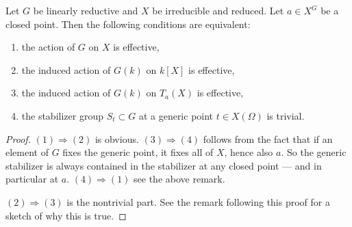 \documentclass[12pt]{article}
\begin{document}
\begin{lemma}[2.4]
Let $G$ be linearly reductive and $X$ be irreducible and reduced.  
Let $a \in X^G$ be a closed point. Then the following conditions are equivalent:
\begin{enumerate}
   \item the action of $G$ on $X$ is effective,
   \item the induced action of $G(k)$ on $k[X]$ is effective,
   \item the induced action of $G(k)$ on $T_a(X)$ is effective,
   \item the stabilizer group $S_t \subset G$ at a generic point $t \in X(\Omega)$ is trivial.
\end{enumerate}
\end{lemma}
\begin{proof}
$(1) \Rightarrow (2)$ is obvious.
$(3) \Rightarrow (4)$ follows from the fact that if an element of $G$ fixes the generic point, it fixes all of $X$, hence also $a$. So the generic stabilizer is always contained in the stabilizer at any closed point — and in particular at $a$.
$(4) \Rightarrow (1)$ see the above remark.

$(2) \Rightarrow (3)$ is the nontrivial part. See the remark following this proof for a sketch of why this is true.
\end{proof}
\end{document}
